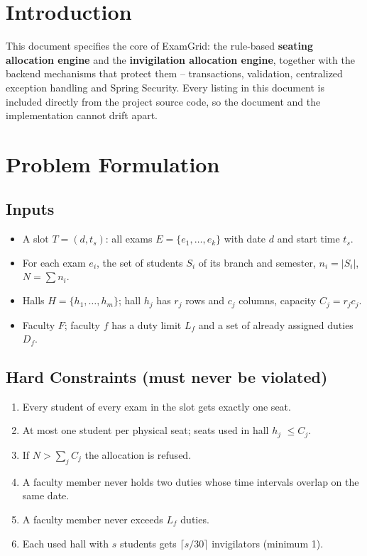 \documentclass[11pt,a4paper]{article}
\begin{document}

\newpage
\tableofcontents
\newpage
{}

\section{Introduction}
This document specifies the core of ExamGrid: the rule-based \textbf{seating allocation engine} and the \textbf{invigilation allocation engine}, together with the backend mechanisms that protect them -- transactions, validation, centralized exception handling and Spring Security. Every listing in this document is included directly from the project source code, so the document and the implementation cannot drift apart.

\section{Problem Formulation}
\subsection{Inputs}
\begin{itemize}
  \item A slot $T = (d, t_s)$: all exams $E = \{e_1, \ldots, e_k\}$ with date $d$ and start time $t_s$.
  \item For each exam $e_i$, the set of students $S_i$ of its branch and semester, $n_i = |S_i|$, $N = \sum n_i$.
  \item Halls $H = \{h_1, \ldots, h_m\}$; hall $h_j$ has $r_j$ rows and $c_j$ columns, capacity $C_j = r_j c_j$.
  \item Faculty $F$; faculty $f$ has a duty limit $L_f$ and a set of already assigned duties $D_f$.
\end{itemize}

\subsection{Hard Constraints (must never be violated)}
\begin{enumerate}[label=\textbf{H\arabic*}]
  \item Every student of every exam in the slot gets exactly one seat.
  \item At most one student per physical seat; seats used in hall $h_j$ $\le C_j$.
  \item If $N > \sum_j C_j$ the allocation is refused.
  \item A faculty member never holds two duties whose time intervals overlap on the same date.
  \item A faculty member never exceeds $L_f$ duties.
  \item Each used hall with $s$ students gets $\lceil s/30\rceil$ invigilators (minimum 1).
\end{enumerate}
\end{document}
